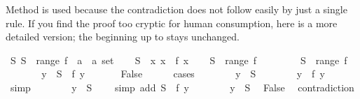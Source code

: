 \begin{isabellebody}
\begin{isamarkuptext}
Method  is used because the contradiction does not follow easily
by just a single rule. If you find the proof too cryptic for human
consumption, here is a more detailed version; the beginning up to
 stays unchanged.%
\end{isamarkuptext}%
\isamarkuptrue%
\isamarkupfalse%
\ {\isachardoublequoteopen}{\isasymexists}S{\isachardot}\ S\ {\isasymnotin}\ range\ {\isacharparenleft}f\ {\isacharcolon}{\isacharcolon}\ {\isacharprime}a\ {\isasymRightarrow}\ {\isacharprime}a\ set{\isacharparenright}{\isachardoublequoteclose}\isanewline
%
\isadelimproof
%
\endisadelimproof
%
\isatagproof
{}\isamarkupfalse%
\isanewline
\ \ \isamarkupfalse%
\ {\isacharquery}S\ {\isacharequal}\ {\isachardoublequoteopen}{\isacharbraceleft}x{\isachardot}\ x\ {\isasymnotin}\ f\ x{\isacharbraceright}{\isachardoublequoteclose}\isanewline
\ \ \isamarkupfalse%
\ {\isachardoublequoteopen}{\isacharquery}S\ {\isasymnotin}\ range\ f{\isachardoublequoteclose}\isanewline
\ \ \isamarkupfalse%
\isanewline
\ \ \ \ \isamarkupfalse%
\ {\isachardoublequoteopen}{\isacharquery}S\ {\isasymin}\ range\ f{\isachardoublequoteclose}\isanewline
\ \ \ \ \isamarkupfalse%
\ \isamarkupfalse%
\ y\ \ {\isachardoublequoteopen}{\isacharquery}S\ {\isacharequal}\ f\ y{\isachardoublequoteclose}\ \isacommand{{\isachardot}{\isachardot}}\isamarkupfalse%
\isanewline
\ \ \ \ \isamarkupfalse%
\ False\isanewline
\ \ \ \ \isamarkupfalse%
\ cases\isanewline
\ \ \ \ \ \ \isamarkupfalse%
\ {\isachardoublequoteopen}y\ {\isasymin}\ {\isacharquery}S{\isachardoublequoteclose}\isanewline
\ \ \ \ \ \ \isamarkupfalse%
\ {\isachardoublequoteopen}y\ {\isasymnotin}\ f\ y{\isachardoublequoteclose}\ \ \ \isamarkupfalse%
\ simp\isanewline
\ \ \ \ \ \ \isamarkupfalse%
\ {\isachardoublequoteopen}y\ {\isasymnotin}\ {\isacharquery}S{\isachardoublequoteclose}\ \ \ \ \isamarkupfalse%
{\isacharparenleft}simp\ add{\isacharcolon}\ {\isacharbackquoteopen}{\isacharquery}S\ {\isacharequal}\ f\ y{\isacharbackquoteclose}{\isacharparenright}\isanewline
\ \ \ \ \ \ \isamarkupfalse%
\ {\isacharbackquoteopen}y\ {\isasymin}\ {\isacharquery}S{\isacharbackquoteclose}\ \isamarkupfalse%
\ False\ \isamarkupfalse%
\ contradiction\isanewline
\ \ \ \ \isamarkupfalse%
\isanewline

\end{isabellebody}
